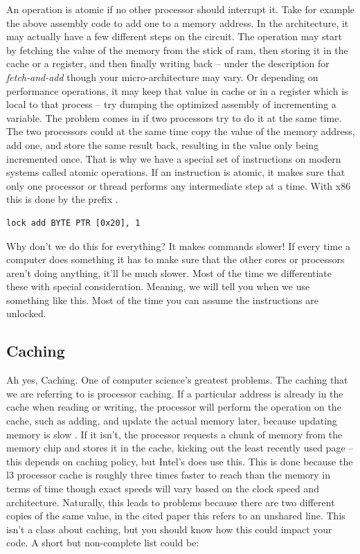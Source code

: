 An operation is atomic if no other processor should interrupt it. Take for example the above assembly code to add one to a memory address.
In the architecture, it may actually have a few different steps on the circuit.
The operation may start by fetching the value of the memory from the stick of ram, then storing it in the cache or a register, and then finally writing back \cite{schweizer2015evaluating} -- under the description for \textit{fetch-and-add} though your micro-architecture may vary.
Or depending on performance operations, it may keep that value in cache or in a register which is local to that process -- try dumping the  optimized assembly of incrementing a variable.
The problem comes in if two processors try to do it at the same time.
The two processors could at the same time copy the value of the memory address, add one, and store the same result back, resulting in the value only being incremented once.
That is why we have a special set of instructions on modern systems called atomic operations.
If an instruction is atomic, it makes sure that only one processor or thread performs any intermediate step at a time.
With x86 this is done by the  prefix \cite[p. 1120]{guide2011intel}.

\begin{lstlisting}
lock add BYTE PTR [0x20], 1
\end{lstlisting}

Why don't we do this for everything?
It makes commands slower! If every time a computer does something it has to make sure that the other cores or processors aren't doing anything, it'll be much slower.
Most of the time we differentiate these with special consideration.
Meaning, we will tell you when we use something like this.
Most of the time you can assume the instructions are unlocked.

\subsection{Caching}

Ah yes, Caching.
One of computer science's greatest problems.
The caching that we are referring to is processor caching.
If a particular address is already in the cache when reading or writing, the processor will perform the operation on the cache, such as adding, and update the actual memory later, because updating memory is slow \cite[Section 3.4]{intel2015improving}.
If it isn't, the processor requests a chunk of memory from the memory chip and stores it in the cache, kicking out the least recently used page -- this depends on caching policy, but Intel's does use this.
This is done because the l3 processor cache is roughly three times faster to reach than the memory in terms of time \cite[p. 22]{levinthal2009performance} though exact speeds will vary based on the clock speed and architecture.
Naturally, this leads to problems because there are two different copies of the same value, in the cited paper this refers to an unshared line.
This isn't a class about caching, but you should know how this could impact your code.
A short but non-complete list could be:

